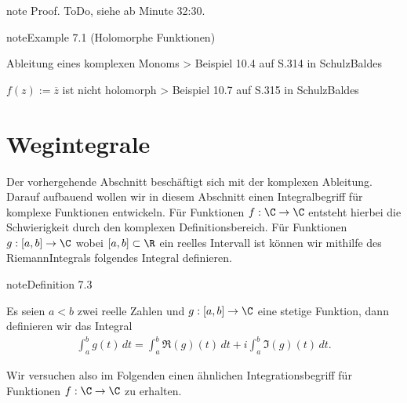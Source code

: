 \documentclass[letterpaper,10pt,german]{jupyterBook}
\begin{document}
\begin{sphinxadmonition}{note}
\sphinxAtStartPar
Proof. ToDo, siehe  ab Minute 32:30.
\end{sphinxadmonition}
\label{complexanalysis/cauchyriemann:example-8}
\begin{sphinxadmonition}{note}{Example 7.1 (Holomorphe Funktionen)}



\sphinxAtStartPar
Ableitung eines komplexen Monoms \sphinxhyphen{}> Beispiel 10.4 auf S.314 in Schulz\sphinxhyphen{}Baldes

\sphinxAtStartPar
\(f(z) := \overline{z}\) ist nicht holomorph \sphinxhyphen{}> Beispiel 10.7 auf S.315 in Schulz\sphinxhyphen{}Baldes
\end{sphinxadmonition}


\section{Wegintegrale}
\label{\detokenize{complexanalysis/kurvenintegrale:wegintegrale}}\label{\detokenize{complexanalysis/kurvenintegrale::doc}}
\sphinxAtStartPar
Der vorhergehende Abschnitt beschäftigt sich mit der komplexen Ableitung. Darauf aufbauend wollen wir in diesem Abschnitt einen Integralbegriff für komplexe Funktionen entwickeln. Für Funktionen \(f:\C\to\C\) entsteht hierbei die Schwierigkeit durch den komplexen Definitionsbereich. Für Funktionen \(g:[a,b]\to\C\) wobei \([a,b]\subset\R\) ein reelles Intervall ist können wir mithilfe des Riemann\sphinxhyphen{}Integrals folgendes Integral definieren.
\label{complexanalysis/kurvenintegrale:definition-0}
\begin{sphinxadmonition}{note}{Definition 7.3}



\sphinxAtStartPar
Es seien \(a<b\) zwei reelle Zahlen und \(g:[a,b]\to\C\) eine stetige Funktion, dann definieren wir das Integral
\begin{equation*}
\begin{split}\int_a^b g(t)\, dt = \int_a^b \Re(g)(t)\,dt + i\int_a^b \Im(g)(t)\, dt.\end{split}
\end{equation*}\end{sphinxadmonition}

\sphinxAtStartPar
Wir versuchen also im Folgenden einen ähnlichen Integrationsbegriff für Funktionen \(f:\C\to\C\) zu erhalten.
\end{document}
